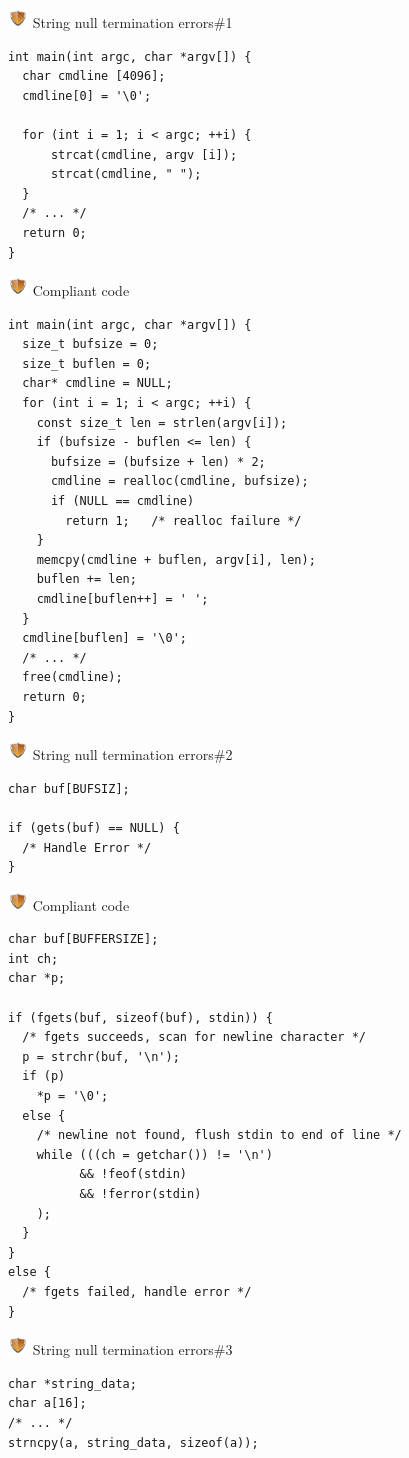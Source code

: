 \documentclass{beamer}
\newcommand{\shield}{\includegraphics[width=15pt]{shield.png} \hspace*{5pt}}
\begin{document}
\begin{frame}[fragile]{\shield String null termination errors\#1}
\begin{lstlisting}[style=cstyle]
int main(int argc, char *argv[]) {
  char cmdline [4096];
  cmdline[0] = '\0';
 
  for (int i = 1; i < argc; ++i) {
      strcat(cmdline, argv [i]);
      strcat(cmdline, " ");
  }
  /* ... */
  return 0;
}
\end{lstlisting}
\end{frame}
\begin{frame}[fragile]{\shield Compliant code}
\begin{lstlisting}[style=cstyle]
int main(int argc, char *argv[]) {
  size_t bufsize = 0;
  size_t buflen = 0;
  char* cmdline = NULL;
  for (int i = 1; i < argc; ++i) {
    const size_t len = strlen(argv[i]);
    if (bufsize - buflen <= len) {
      bufsize = (bufsize + len) * 2;
      cmdline = realloc(cmdline, bufsize);
      if (NULL == cmdline)
        return 1;   /* realloc failure */
    }
    memcpy(cmdline + buflen, argv[i], len);
    buflen += len;
    cmdline[buflen++] = ' ';
  }
  cmdline[buflen] = '\0';
  /* ... */
  free(cmdline);
  return 0;
}
\end{lstlisting}
\end{frame}
\begin{frame}[fragile]{\shield String null termination errors\#2}
\begin{lstlisting}[style=cstyle]
char buf[BUFSIZ];

if (gets(buf) == NULL) {
  /* Handle Error */
}

\end{lstlisting}
\end{frame}
\begin{frame}[fragile]{\shield Compliant code}
\begin{lstlisting}[style=cstyle]
char buf[BUFFERSIZE];
int ch;
char *p;
 
if (fgets(buf, sizeof(buf), stdin)) {
  /* fgets succeeds, scan for newline character */
  p = strchr(buf, '\n');
  if (p) 
    *p = '\0';
  else {
    /* newline not found, flush stdin to end of line */
    while (((ch = getchar()) != '\n')
          && !feof(stdin)
          && !ferror(stdin)
    );
  }
}
else {
  /* fgets failed, handle error */
}
\end{lstlisting}
\end{frame}

\begin{frame}[fragile]{\shield String null termination errors\#3}
\begin{lstlisting}[style=cstyle]
char *string_data;
char a[16];
/* ... */
strncpy(a, string_data, sizeof(a));
\end{lstlisting}
\end{frame}
\end{document}

